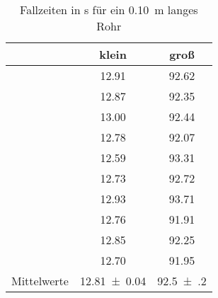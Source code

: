 \begin{table}[h!]
\centering
\begin{tabular}{c|c|c}
	& klein & groß \\
	\hline
	& 12.91 & 92.62 \\
	& 12.87 & 92.35 \\
	& 13.00 & 92.44 \\
	& 12.78 & 92.07 \\
	& 12.59 & 93.31 \\
	& 12.73 & 92.72 \\
	& 12.93 & 93.71 \\
	& 12.76 & 91.91 \\
	& 12.85 & 92.25 \\
	& 12.70 & 91.95 \\
	\hline
	Mittelwerte & \SI{12.81(4)}{} & \SI{92.5(2)}{}
\end{tabular}
\caption{Fallzeiten in \si{\second} für ein \SI{0.10}{\metre} langes Rohr}
\label{fig:DatenZeit}
\end{table}